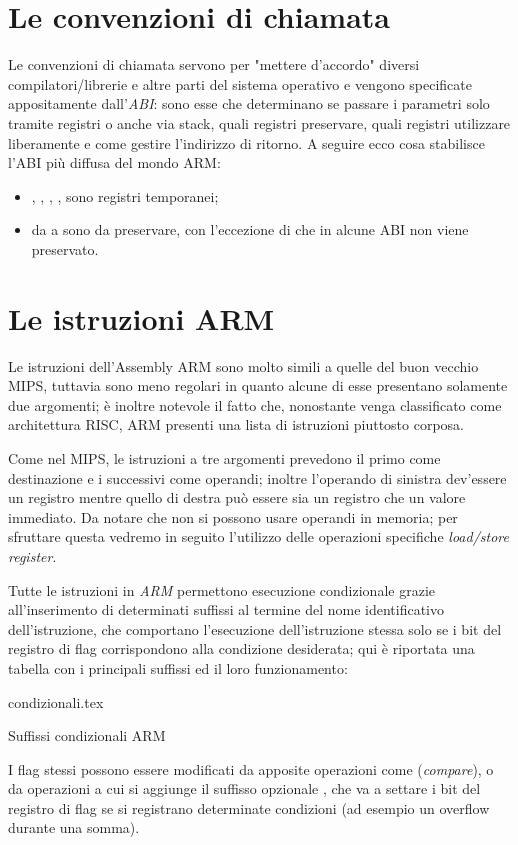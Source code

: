\documentclass[class=book, crop=false, oneside]{standalone}
\begin{document}
\section{Le convenzioni di chiamata}
Le convenzioni di chiamata servono per "mettere d'accordo" diversi compilatori/librerie e altre parti del sistema operativo e vengono specificate appositamente dall'\emph{ABI}: sono esse che determinano se passare i parametri solo tramite registri o anche via stack, quali registri preservare, quali registri utilizzare liberamente e come gestire l'indirizzo di ritorno. A seguire ecco cosa stabilisce l'ABI più diffusa del mondo ARM:
\begin{itemize}
	\item {}, , , ,  sono registri temporanei;
	\item da  a  sono da preservare, con l'eccezione di  che in alcune ABI non viene preservato.
\end{itemize}

\section{Le istruzioni ARM}
Le istruzioni dell'Assembly ARM sono molto simili a quelle del buon vecchio MIPS, tuttavia sono meno regolari in quanto alcune di esse presentano solamente due argomenti; è inoltre notevole il fatto che, nonostante venga classificato come architettura RISC, ARM presenti una lista di istruzioni piuttosto corposa.

Come nel MIPS, le istruzioni a tre argomenti prevedono il primo come destinazione e i successivi come operandi; inoltre l'operando di sinistra dev'essere un registro mentre quello di destra può essere sia un registro che un valore immediato. Da notare che non si possono usare operandi in memoria; per sfruttare questa vedremo in seguito l'utilizzo delle operazioni specifiche \emph{load/store register}.

Tutte le istruzioni in \emph{ARM} permettono esecuzione condizionale grazie all'inserimento di determinati suffissi al termine del nome identificativo dell'istruzione, che comportano l'esecuzione dell'istruzione stessa solo se i bit del registro di flag corrispondono alla condizione desiderata; qui è riportata una tabella con i principali suffissi ed il loro funzionamento:

\vspace{0.4cm}
\begin{table}[H]
	\centering
	{condizionali.tex}
	\caption{Suffissi condizionali ARM}
\end{table}
I flag stessi possono essere modificati da apposite operazioni come  (\emph{compare}), o da operazioni a cui si aggiunge il suffisso opzionale , che va a settare i bit del registro di flag se si registrano determinate condizioni (ad esempio un overflow durante una somma).
\end{document}
